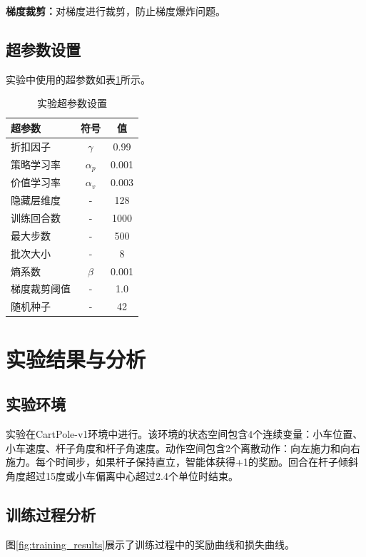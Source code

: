 \documentclass[12pt,a4paper]{article}
\begin{document}
\textbf{梯度裁剪：}对梯度进行裁剪，防止梯度爆炸问题。

\subsection{超参数设置}

实验中使用的超参数如表\ref{tab:hyperparams}所示。

\begin{table}[H]
\centering
\caption{实验超参数设置}
\label{tab:hyperparams}
\begin{tabular}{lcc}
\toprule
\textbf{超参数} & \textbf{符号} & \textbf{值} \\
\midrule
折扣因子 & $\gamma$ & 0.99 \\
策略学习率 & $\alpha_p$ & 0.001 \\
价值学习率 & $\alpha_v$ & 0.003 \\
隐藏层维度 & - & 128 \\
训练回合数 & - & 1000 \\
最大步数 & - & 500 \\
批次大小 & - & 8 \\
熵系数 & $\beta$ & 0.001 \\
梯度裁剪阈值 & - & 1.0 \\
随机种子 & - & 42 \\
\bottomrule
\end{tabular}
\end{table}

\section{实验结果与分析}

\subsection{实验环境}

实验在CartPole-v1环境中进行。该环境的状态空间包含4个连续变量：小车位置、小车速度、杆子角度和杆子角速度。动作空间包含2个离散动作：向左施力和向右施力。每个时间步，如果杆子保持直立，智能体获得+1的奖励。回合在杆子倾斜角度超过15度或小车偏离中心超过2.4个单位时结束。

\subsection{训练过程分析}

图\ref{fig:training_results}展示了训练过程中的奖励曲线和损失曲线。
\end{document}
